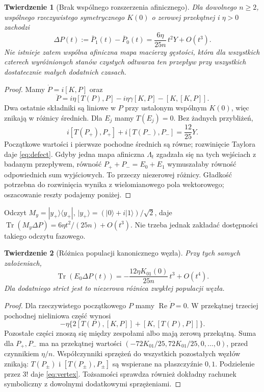 \documentclass[11pt,a4paper]{article}
\newtheorem{theorem}{Twierdzenie}
\newcommand{\Tr}{\operatorname{Tr}}
\newcommand{\Rea}{\operatorname{Re}}
\begin{document}
\begin{theorem}[Brak wspólnego rozszerzenia afinicznego]\label{thm:affine}
Dla dowolnego $n\ge2$, wspólnego rzeczywistego symetrycznego $K(0)$
o zerowej przekątnej i $\eta>0$ zachodzi
\begin{equation}\label{eq:defect}
 \Delta P(t):=\bar P_1(t)-\bar P_0(t)
   =\frac{6\eta}{25n}\,t^2Y+O(t^3).
\end{equation}
Nie istnieje zatem wspólna afiniczna mapa macierzy gęstości, która dla
wszystkich czterech wyróżnionych stanów czystych odtwarza ten przepływ
przy wszystkich dostatecznie małych dodatnich czasach.
\end{theorem}

\begin{proof}
Mamy $\dot P=i[K,P]$ oraz
\begin{equation}\label{eq:second}
 \ddot P=i\eta[T(P),P]-i\eta\gamma[K,P]-[K,[K,P]].
\end{equation}
Dwa ostatnie składniki są liniowe w $P$ przy ustalonym wspólnym $K(0)$,
więc znikają w różnicy średnich. Dla $E_j$ mamy $T(E_j)=0$.
Bez żadnych przybliżeń,
\begin{equation}
 i[T(P_+),P_+]+i[T(P_-),P_-]=\frac{12}{25}Y.
\end{equation}
Początkowe wartości i pierwsze pochodne średnich są równe; rozwinięcie
Taylora daje \eqref{eq:defect}. Gdyby jedna mapa afiniczna $\Lambda_t$
zgadzała się na tych wejściach z badanym przepływem, równość
$P_++P_-=E_0+E_1$ wymuszałaby równość odpowiednich sum wyjściowych.
To przeczy niezerowej różnicy. Gładkość potrzebna do rozwinięcia wynika
z wielomianowego pola wektorowego; oszacowanie reszty podajemy poniżej.
\end{proof}

Odczyt $M_y=|y_+\rangle\langle y_+|$,
$|y_+\rangle=(|0\rangle+i|1\rangle)/\sqrt2$, daje
$\Tr(M_y\Delta P)=6\eta t^2/(25n)+O(t^3)$.
Nie trzeba jednak zakładać dostępności takiego odczytu fazowego.

\begin{theorem}[Różnica populacji kanonicznego węzła]\label{thm:vertex}
Przy tych samych założeniach,
\begin{equation}\label{eq:vertex}
 \Tr(E_0\Delta P(t))=-\frac{12\eta K_{01}(0)}{25n}\,t^3+O(t^4).
\end{equation}
Dla dodatniego strict jest to niezerowa różnica zwykłej populacji węzła.
\end{theorem}

\begin{proof}
Dla rzeczywistego początkowego $P$ mamy $\Rea\dot P=0$.
W przekątnej trzeciej pochodnej nieliniowa część wynosi
\[
 -\eta\{2[T(P),[K,P]]+[K,[T(P),P]]\}.
\]
Pozostałe części znoszą się między zespołami albo mają zerową przekątną.
Suma dla $P_+,P_-$ ma na przekątnej wartości
$(-72K_{01}/25,72K_{01}/25,0,\ldots,0)$, przed czynnikiem $\eta/n$.
Współczynniki sprzężeń do wszystkich pozostałych węzłów znikają:
$T(P_\pm)$ i $[T(P_\pm),P_\pm]$ są wspierane na płaszczyźnie $0,1$.
Podzielenie przez $3!$ daje \eqref{eq:vertex}. Tożsamości sprawdza
również dokładny rachunek symboliczny z dowolnymi dodatkowymi sprzężeniami.
\end{proof}
\end{document}
